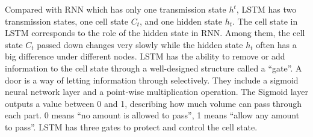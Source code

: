 
Compared with RNN which has only one transmission state \(h^t\), LSTM has two transmission states, one cell state \(C_t\), and one hidden state \(h_t\). The cell state in LSTM corresponds to the role of the hidden state in RNN\@. Among them, the cell state \(C_t\) passed down changes very slowly while the hidden state \(h_t\) often has a big difference under different nodes. LSTM has the ability to remove or add information to the cell state through a well-designed structure called a ``gate''. A door is a way of letting information through selectively. They include a sigmoid neural network layer and a point-wise multiplication operation. The Sigmoid layer outputs a value between 0 and 1, describing how much volume can pass through each part. 0 means ``no amount is allowed to pass'', 1 means ``allow any amount to pass''. LSTM has three gates to protect and control the cell state.

